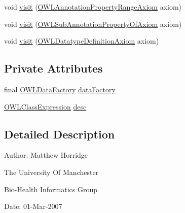 \begin{DoxyCompactItemize}
\item 
void \hyperlink{classorg_1_1semanticweb_1_1owlapi_1_1debugging_1_1_debugger_class_expression_generator_a59cc5d82eaf942886d08dda304d5bb3a}{visit} (\hyperlink{interfaceorg_1_1semanticweb_1_1owlapi_1_1model_1_1_o_w_l_annotation_property_range_axiom}{O\-W\-L\-Annotation\-Property\-Range\-Axiom} axiom)
\item 
void \hyperlink{classorg_1_1semanticweb_1_1owlapi_1_1debugging_1_1_debugger_class_expression_generator_a471bfbb6694983238a76f560f220d6c8}{visit} (\hyperlink{interfaceorg_1_1semanticweb_1_1owlapi_1_1model_1_1_o_w_l_sub_annotation_property_of_axiom}{O\-W\-L\-Sub\-Annotation\-Property\-Of\-Axiom} axiom)
\item 
void \hyperlink{classorg_1_1semanticweb_1_1owlapi_1_1debugging_1_1_debugger_class_expression_generator_a5e00d2412ecef80a79f3078a6b7ba425}{visit} (\hyperlink{interfaceorg_1_1semanticweb_1_1owlapi_1_1model_1_1_o_w_l_datatype_definition_axiom}{O\-W\-L\-Datatype\-Definition\-Axiom} axiom)
\end{DoxyCompactItemize}
\subsection*{Private Attributes}
\begin{DoxyCompactItemize}
\item 
final \hyperlink{interfaceorg_1_1semanticweb_1_1owlapi_1_1model_1_1_o_w_l_data_factory}{O\-W\-L\-Data\-Factory} \hyperlink{classorg_1_1semanticweb_1_1owlapi_1_1debugging_1_1_debugger_class_expression_generator_a0729084eb315885838086f4d25ab8562}{data\-Factory}
\item 
\hyperlink{interfaceorg_1_1semanticweb_1_1owlapi_1_1model_1_1_o_w_l_class_expression}{O\-W\-L\-Class\-Expression} \hyperlink{classorg_1_1semanticweb_1_1owlapi_1_1debugging_1_1_debugger_class_expression_generator_a6b90359123ab9ec178f892f92b20d831}{desc}
\end{DoxyCompactItemize}


\subsection{Detailed Description}
Author\-: Matthew Horridge\par
 The University Of Manchester\par
 Bio-\/\-Health Informatics Group\par
 Date\-: 01-\/\-Mar-\/2007\par
 \par
 

